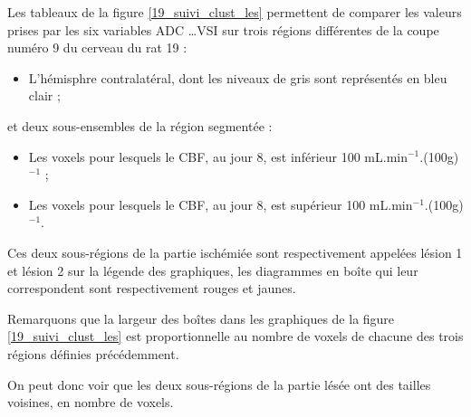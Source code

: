 Les tableaux de la figure \ref{19_suivi_clust_les} permettent de comparer les valeurs prises par les six variables ADC \dots VSI %
sur trois r\'egions diff\'erentes de la coupe num\'ero 9 du cerveau du rat 19 :
\begin{itemize}
\item L'h\'emisphre contralat\'eral, dont les niveaux de gris sont repr\'esent\'es en bleu clair ;
\end{itemize}

et deux sous-ensembles de la r\'egion segment\'ee :
\begin{itemize}
\item Les voxels pour lesquels le CBF, au jour 8, est inf\'erieur  100 mL.min${}^{-1}$.(100g)${}^{-1}$ ;
\item Les voxels pour lesquels le CBF, au jour 8, est sup\'erieur  100 mL.min${}^{-1}$.(100g)${}^{-1}$.
\end{itemize}

Ces deux sous-r\'egions de la partie isch\'emi\'ee sont respectivement appel\'ees l\'esion 1 et l\'esion 2 sur la l\'egende des graphiques, %
les diagrammes en bo\^ite qui leur correspondent sont respectivement rouges et jaunes.

\par
Remarquons que la largeur des bo\^ites dans les graphiques de la figure \ref{19_suivi_clust_les} %
est proportionnelle au nombre de voxels de chacune des trois r\'egions d\'efinies pr\'ec\'edemment.

\par
On peut donc voir que les deux sous-r\'egions de la partie l\'es\'ee ont des tailles voisines, en nombre de voxels.


